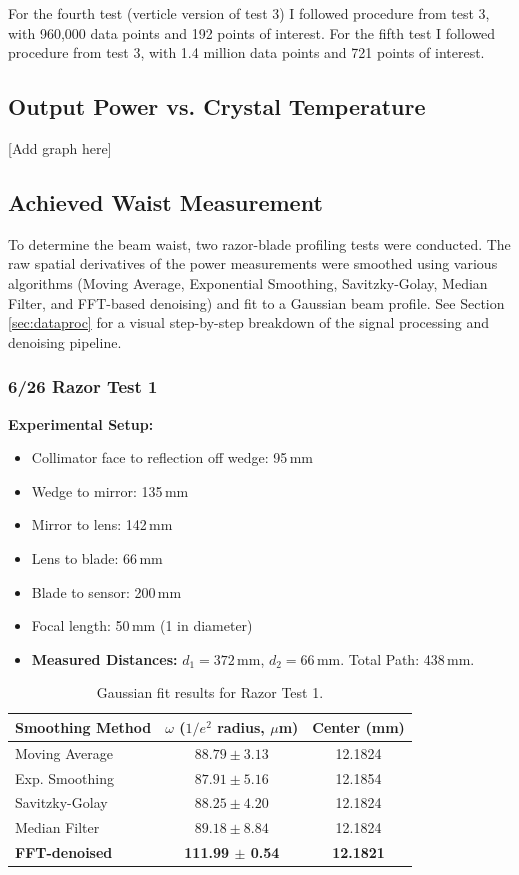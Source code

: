 \documentclass[11pt, letterpaper]{article}
\begin{document}
For the fourth test (verticle version of test 3) I followed procedure from test 3, with 960,000 data points and 192 points of interest.
For the fifth test I followed procedure from test 3, with 1.4 million
 data points and 721 points of interest.


\subsection{Output Power vs. Crystal Temperature}
[Add graph here]

\subsection{Achieved Waist Measurement}

To determine the beam waist, two razor-blade profiling tests were conducted. The raw spatial derivatives of the power measurements were smoothed using various algorithms (Moving Average, Exponential Smoothing, Savitzky-Golay, Median Filter, and FFT-based denoising) and fit to a Gaussian beam profile. See Section \ref{sec:dataproc} for a visual step-by-step breakdown of the signal processing and denoising pipeline.

\subsubsection*{6/26 Razor Test 1}

\textbf{Experimental Setup:}
\begin{itemize}
    \item Collimator face to reflection off wedge: 95\,mm
    \item Wedge to mirror: 135\,mm
    \item Mirror to lens: 142\,mm
    \item Lens to blade: 66\,mm
    \item Blade to sensor: 200\,mm
    \item Focal length: 50\,mm (1 in diameter)
    \item \textbf{Measured Distances:} $d_1 = 372$\,mm, $d_2 = 66$\,mm. Total Path: 438\,mm.
\end{itemize}

\begin{table}[H]
    \centering
    \begin{tabular}{lcc}
        \toprule
        \textbf{Smoothing Method} & \textbf{$\omega$ ($1/e^2$ radius, $\mu$m)} & \textbf{Center (mm)} \\
        \midrule
        Moving Average & $88.79 \pm 3.13$ & 12.1824 \\
        Exp. Smoothing & $87.91 \pm 5.16$ & 12.1854 \\
        Savitzky-Golay & $88.25 \pm 4.20$ & 12.1824 \\
        Median Filter  & $89.18 \pm 8.84$ & 12.1824 \\
        \textbf{FFT-denoised} & \textbf{111.99 $\pm$ 0.54} & \textbf{12.1821} \\
        \bottomrule
    \end{tabular}
    \caption{Gaussian fit results for Razor Test 1.}
\end{table}
\end{document}
